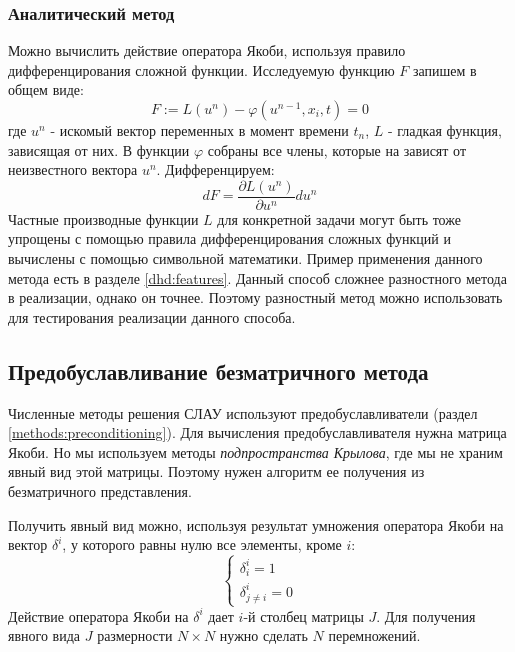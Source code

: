 \subsubsection*{Аналитический метод}
Можно вычислить действие оператора Якоби, используя правило дифференцирования сложной функции. Исследуемую функцию $F$ запишем в общем виде: 
\begin{equation}
F :=L(u^n) -\varphi(u^{n-1}, x_i, t) = 0
\end{equation}
где $u^n$ - искомый вектор переменных в момент времени $t_n$, $L$ - гладкая функция, зависящая от них. В функции $\varphi$ собраны все члены, которые на зависят от неизвестного вектора $u^n$.
Дифференцируем:
\begin{equation}
dF = \frac{\partial L(u^n)} {\partial u^n} du^n
\end{equation}
Частные производные функции $L$ для конкретной задачи могут быть тоже упрощены с помощью правила дифференцирования сложных функций и вычислены с помощью символьной математики. Пример применения данного метода есть в разделе \ref{dhd:features}. Данный способ сложнее разностного метода в реализации, однако он точнее. Поэтому разностный метод можно использовать для тестирования реализации данного способа.

\subsection{Предобуславливание безматричного метода \label{implementation:operator_preconditioning}}
Численные методы решения СЛАУ используют предобуславливатели (раздел \ref{methods:preconditioning}). Для вычисления предобуславливателя нужна матрица Якоби. Но мы используем методы \textit{подпространства Крылова}, где мы не храним явный вид этой матрицы. Поэтому нужен алгоритм ее получения из безматричного представления. 
\par
Получить явный вид можно, используя результат умножения оператора Якоби на вектор $\delta^i$, у которого равны нулю все элементы, кроме $i$:
\begin{equation}
\begin{cases}
\delta^i_i = 1
\\
\delta^i_{j \neq i} = 0
\end{cases}
\end{equation}
Действие оператора Якоби на $\delta^i$ дает $i$-й столбец матрицы $J$. Для получения явного вида $J$ размерности $N \times N$ нужно сделать $N$ перемножений. 

